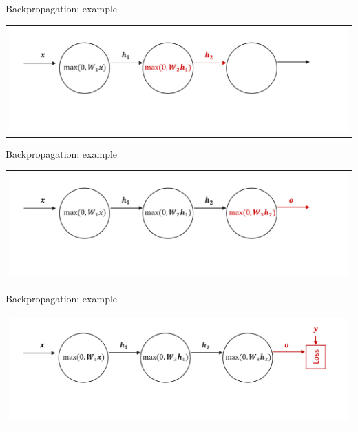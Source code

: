 \documentclass[aspectratio=169]{beamer}
\begin{document}

\begin{frame}{Backpropagation: example}
\begin{tabular}{c}
\includegraphics[width=1.\textwidth]{img/dnn/backprop/backprop_3.png}
\end{tabular}	
\end{frame}


\begin{frame}{Backpropagation: example}
\begin{tabular}{c}
\includegraphics[width=1.\textwidth]{img/dnn/backprop/backprop_4.png}
\end{tabular}	
\end{frame}


\begin{frame}{Backpropagation: example}
\begin{tabular}{c}
\includegraphics[width=1.\textwidth]{img/dnn/backprop/backprop_5.png}
\end{tabular}	
\end{frame}
\end{document}
